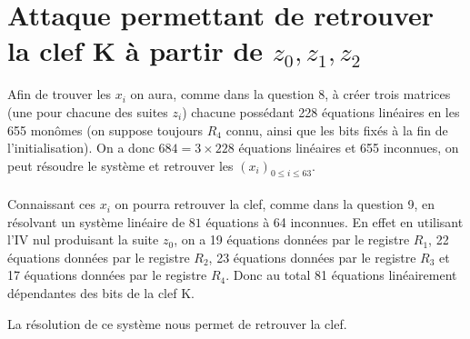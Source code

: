 \section{Attaque permettant de retrouver la clef K à partir de $z_0, z_1, z_2$}
Afin de trouver les $x_i$ on aura, comme dans la question 8, à créer trois matrices (une pour chacune des suites $z_i$)
chacune possédant 228 équations linéaires en les 655 monômes (on suppose toujours $R_4$ connu, ainsi que les bits fixés à la fin de l'initialisation).
On a donc $684 = 3 \times 228$ équations linéaires et 655 inconnues, on peut résoudre le système et retrouver les $(x_i)_{0\leq i \leq 63}$.
\paragraph{}
Connaissant ces $x_i$ on pourra retrouver la clef, comme dans la question 9, en résolvant un système linéaire de $81$ équations à 64 inconnues.
En effet en utilisant l'IV nul produisant la suite $z_0$, on a 19 équations données par le registre $R_1$, 22 équations données par le registre $R_2$, 23 équations données par le registre $R_3$ et 17 équations données par le registre $R_4$.
Donc au total 81 équations linéairement dépendantes des bits de la clef K.

La résolution de ce système nous permet de retrouver la clef.
